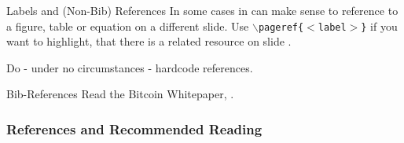\documentclass[handout]{beamer}
\begin{document}
\begin{frame}{Labels and (Non-Bib) References}
	In some cases in can make sense to reference to a figure, table or equation on a different slide. Use \texttt{$\backslash$pageref\{$<$label$>$\}} if you want to highlight, that there is a related resource on slide \pageref{fig:logo}.\\ \vspace{1em}
	
	Do - under no circumstances - hardcode references.	
\end{frame}

\begin{frame}{Bib-References}
		Read the Bitcoin Whitepaper, \cite{nakamotoBitcoin2008}.
\end{frame}

\begin{frame}%
\frametitle{References and Recommended Reading}
	
	
\end{frame}
\end{document}
